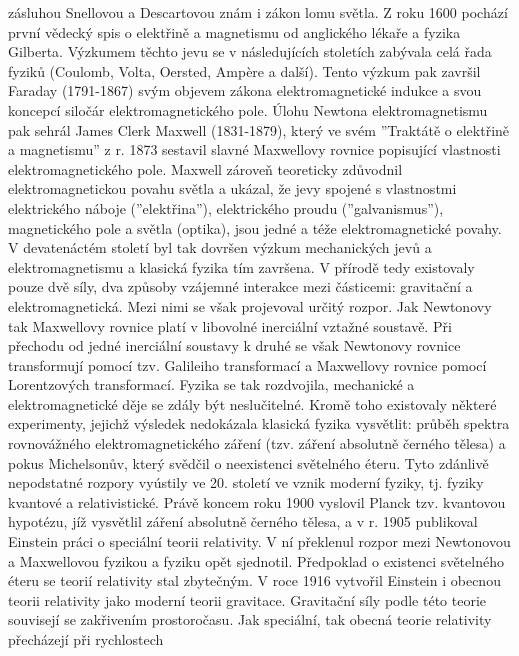     zásluhou Snellovou a Descartovou znám i zákon lomu světla. Z roku 1600 pochází první vědecký
    spis o elektřině a magnetismu od anglického lékaře a fyzika Gilberta. Výzkumem  těchto jevu se v
    následujících stoletích zabývala celá řada fyziků (Coulomb, Volta, Oersted, Amp\`{e}re a další).
    Tento výzkum pak završil Faraday (1791-1867) svým objevem zákona elektromagnetické indukce a
    svou koncepcí siločár elektromagnetického pole. Úlohu Newtona elektromagnetismu pak sehrál James
    Clerk Maxwell (1831-1879), který ve svém ”Traktátě o elektřině a magnetismu” z r. 1873 sestavil
    slavné Maxwellovy rovnice popisující vlastnosti elektromagnetického pole. Maxwell zároveň
    teoreticky zdůvodnil elektromagnetickou povahu světla a ukázal, že jevy spojené s vlastnostmi
    elektrického náboje (”elektřina”), elektrického proudu (”galvanismus”), magnetického pole a
    světla (optika), jsou jedné a téže elektromagnetické povahy. V devatenáctém století byl tak
    dovršen výzkum mechanických jevů a elektromagnetismu a klasická fyzika tím za\-vršena. V přírodě
    tedy existovaly pouze dvě síly, dva způsoby vzájemné interakce mezi částicemi: gravitační a
    elektromagnetická. Mezi nimi se však projevoval určitý rozpor. Jak Newtonovy tak Maxwellovy
    rovnice platí v libovolné inerciální vztažné soustavě. Při přechodu od jedné inerciální soustavy
    k druhé se však Newtonovy rovnice transformují pomocí tzv. Galileiho transformací a Maxwellovy
    rovnice pomocí Lorentzových transformací. Fyzika se tak rozdvojila, mechanické a
    elektromagnetické děje se zdály být neslučitelné. Kromě toho existovaly některé experimenty,
    jejichž výsledek nedokázala klasická fyzika vysvětlit: průběh spektra rovnovážného
    elektromagnetického záření (tzv. záření absolutně černého tělesa) a pokus Michelsonův, který
    svědčil o neexistenci světelného éteru. Tyto zdánlivě nepodstatné rozpory vyústily ve 20.
    století ve vznik moderní fyziky, tj. fyziky kvantové a relativistické. Právě koncem roku 1900
    vyslovil Planck tzv. kvantovou hypotézu, jíž vysvětlil záření absolutně černého tělesa, a v r.
    1905 publikoval Einstein práci o speciální teorii relativity. V ní překlenul rozpor mezi
    Newtonovou a Maxwellovou fyzikou a fyziku opět sjednotil. Předpoklad o existenci světelného
    éteru se teorií relativity stal zbytečným. V roce 1916 vytvořil Einstein i obecnou teorii
    relativity jako moderní teorii gravitace. Gravitační síly podle této teorie souvisejí se
    zakřivením prostoročasu. Jak speciální, tak obecná teorie relativity přecházejí při rychlostech
